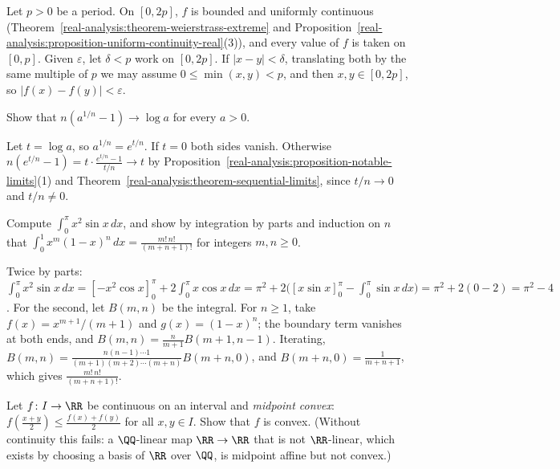 \begin{solution}
Let $p > 0$ be a period. On $[0, 2p]$, $f$ is bounded and uniformly continuous (Theorem~\ref{real-analysis:theorem-weierstrass-extreme} and Proposition~\ref{real-analysis:proposition-uniform-continuity-real}(3)), and
every value of $f$ is taken on $[0, p]$. Given $\varepsilon$, let $\delta < p$ work on $[0, 2p]$. If $|x - y| < \delta$, translating both by the same multiple of $p$ we may assume $0 \leq \min(x, y) < p$, and then
$x, y \in [0, 2p]$, so $|f(x) - f(y)| < \varepsilon$.
\end{solution}

\begin{exercise}\label{real-analysis:exercise-log-limit}
Show that $n(a^{1/n} - 1) \to \log a$ for every $a > 0$.
\end{exercise}

\begin{solution}
Let $t = \log a$, so $a^{1/n} = e^{t/n}$. If $t = 0$ both sides vanish. Otherwise $n(e^{t/n} - 1) = t\cdot\frac{e^{t/n} - 1}{t/n} \to t$ by Proposition~\ref{real-analysis:proposition-notable-limits}(1) and
Theorem~\ref{real-analysis:theorem-sequential-limits}, since $t/n \to 0$ and $t/n \neq 0$.
\end{solution}

\begin{exercise}\label{real-analysis:exercise-integration-by-parts}
Compute $\int_0^\pi x^2\sin x\,dx$, and show by integration by parts and induction on $n$ that $\int_0^1x^m(1 - x)^n\,dx = \frac{m!\,n!}{(m + n + 1)!}$ for integers $m, n \geq 0$.
\end{exercise}

\begin{solution}
Twice by parts: $\int_0^\pi x^2\sin x\,dx = [-x^2\cos x]_0^\pi + 2\int_0^\pi x\cos x\,dx = \pi^2 + 2\bigl([x\sin x]_0^\pi - \int_0^\pi\sin x\,dx\bigr) = \pi^2 + 2(0 - 2) = \pi^2 - 4$. For the second, let
$B(m, n)$ be the integral. For $n \geq 1$, take $f(x) = x^{m+1}/(m + 1)$ and $g(x) = (1 - x)^n$; the boundary term vanishes at both ends, and $B(m, n) = \frac{n}{m+1}B(m + 1, n - 1)$. Iterating,
$B(m, n) = \frac{n(n-1) \cdots 1}{(m+1)(m+2) \cdots (m+n)}B(m + n, 0)$, and $B(m + n, 0) = \frac{1}{m + n + 1}$, which gives $\frac{m!\,n!}{(m + n + 1)!}$.
\end{solution}

\begin{exercise}\label{real-analysis:exercise-midpoint-convex}
Let $f \colon I \to \RR$ be continuous on an interval and \emph{midpoint convex}: $f(\frac{x + y}2) \leq \frac{f(x) + f(y)}2$ for all $x, y \in I$. Show that $f$ is convex. (Without continuity this
fails: a $\QQ$-linear map $\RR \to \RR$ that is not $\RR$-linear, which exists by choosing a basis of $\RR$ over $\QQ$, is midpoint affine but not convex.)
\end{exercise}

